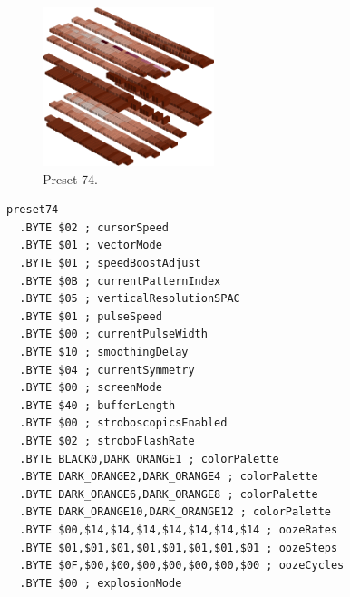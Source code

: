 \vspace*{0.5cm}
\begin{minipage}[b]{0.48\linewidth}
\begin{figure}[H]                                                          
  \centering                                                             
  \begin{adjustbox}{width=5cm,center}                                   
  \includegraphics[width=5cm]{src/colorspace_presets/preset74-45.png}%
  \end{adjustbox}                                                        
\caption*{Preset 74.}                                           
\end{figure}                                                               
\end{minipage}
\hspace{0.1cm}
\begin{minipage}[b]{0.48\linewidth}                                                                         
\begin{lstlisting}[basicstyle=\ttfamily\tiny]
preset74
  .BYTE $02 ; cursorSpeed
  .BYTE $01 ; vectorMode
  .BYTE $01 ; speedBoostAdjust
  .BYTE $0B ; currentPatternIndex
  .BYTE $05 ; verticalResolutionSPAC
  .BYTE $01 ; pulseSpeed
  .BYTE $00 ; currentPulseWidth
  .BYTE $10 ; smoothingDelay
  .BYTE $04 ; currentSymmetry
  .BYTE $00 ; screenMode
  .BYTE $40 ; bufferLength
  .BYTE $00 ; stroboscopicsEnabled
  .BYTE $02 ; stroboFlashRate
  .BYTE BLACK0,DARK_ORANGE1 ; colorPalette
  .BYTE DARK_ORANGE2,DARK_ORANGE4 ; colorPalette
  .BYTE DARK_ORANGE6,DARK_ORANGE8 ; colorPalette
  .BYTE DARK_ORANGE10,DARK_ORANGE12 ; colorPalette
  .BYTE $00,$14,$14,$14,$14,$14,$14,$14 ; oozeRates
  .BYTE $01,$01,$01,$01,$01,$01,$01,$01 ; oozeSteps
  .BYTE $0F,$00,$00,$00,$00,$00,$00,$00 ; oozeCycles
  .BYTE $00 ; explosionMode
\end{lstlisting}
\end{minipage}


